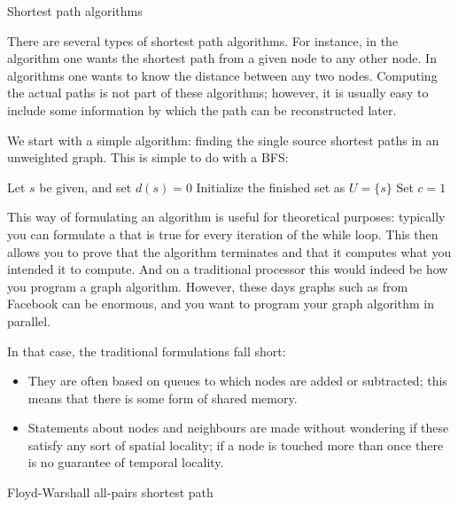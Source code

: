  {Shortest path algorithms}
\label{sec:sssp}

There are several types of shortest path algorithms. For instance,
in the  algorithm
one wants the shortest path from a given node to any other node.
In  algorithms
one wants to know the distance between any two nodes.
Computing the actual paths is not part of these algorithms; 
however, it is usually easy to include some information by
which the path can be reconstructed later.

We start with a simple algorithm: finding the single source shortest
paths in an unweighted graph. This is simple to do with a \acf{BFS}:

\begin{displayalgorithm}
  Let $s$ be given, and set $d(s)=0$\;
  Initialize the finished set as $U=\{s\}$\;
  Set $c=1$\;
\end{displayalgorithm}

This way of formulating an algorithm is useful for theoretical purposes:
typically you can formulate a  that is true
for every iteration of the while loop. This then allows you to prove
that the algorithm terminates and that it computes what you intended it to compute.
And on a traditional processor this would indeed be how you program 
a graph algorithm. However, these days graphs such as from Facebook 
can be enormous, and you want to program your graph algorithm in
parallel.

In that case, the traditional formulations fall short:
\begin{itemize}
\item They are often based on queues to which nodes are added or subtracted; this means
  that there is some form of shared memory.
\item Statements about nodes and neighbours are made without wondering if these
  satisfy any sort of spatial locality; if a node is touched more than once there is
  no guarantee of temporal locality.
\end{itemize}

 {Floyd-Warshall all-pairs shortest path}
\label{sec:floyd}

